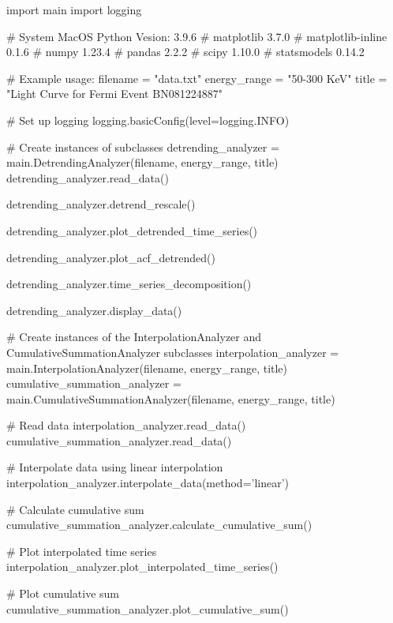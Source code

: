 \documentclass[nofootinbib,aps]{revtex4}
\begin{document}
\begin{framed}
    \begin{pythoncode}[caption={presentation.py code}]

        import main
    import logging

    # System MacOS Python Vesion: 3.9.6
    # matplotlib                3.7.0
    # matplotlib-inline         0.1.6
    # numpy                     1.23.4
    # pandas                    2.2.2
    # scipy                     1.10.0
    # statsmodels               0.14.2

    # Example usage:
    filename = "data.txt"
    energy_range = "50-300 KeV"
    title = "Light Curve for Fermi Event BN081224887"  

    # Set up logging
    logging.basicConfig(level=logging.INFO)

    # Create instances of subclasses
    detrending_analyzer = main.DetrendingAnalyzer(filename, energy_range, title)
    detrending_analyzer.read_data()

    detrending_analyzer.detrend_rescale()

    detrending_analyzer.plot_detrended_time_series()

    detrending_analyzer.plot_acf_detrended()

    detrending_analyzer.time_series_decomposition()

    detrending_analyzer.display_data()

    # Create instances of the InterpolationAnalyzer and CumulativeSummationAnalyzer subclasses
    interpolation_analyzer = main.InterpolationAnalyzer(filename, energy_range, title)
    cumulative_summation_analyzer = main.CumulativeSummationAnalyzer(filename, energy_range, title)

    # Read data
    interpolation_analyzer.read_data()
    cumulative_summation_analyzer.read_data()

    # Interpolate data using linear interpolation
    interpolation_analyzer.interpolate_data(method='linear')

    # Calculate cumulative sum
    cumulative_summation_analyzer.calculate_cumulative_sum()

    # Plot interpolated time series
    interpolation_analyzer.plot_interpolated_time_series()

    # Plot cumulative sum
    cumulative_summation_analyzer.plot_cumulative_sum()


    \end{pythoncode}
\end{framed}
\end{document}
